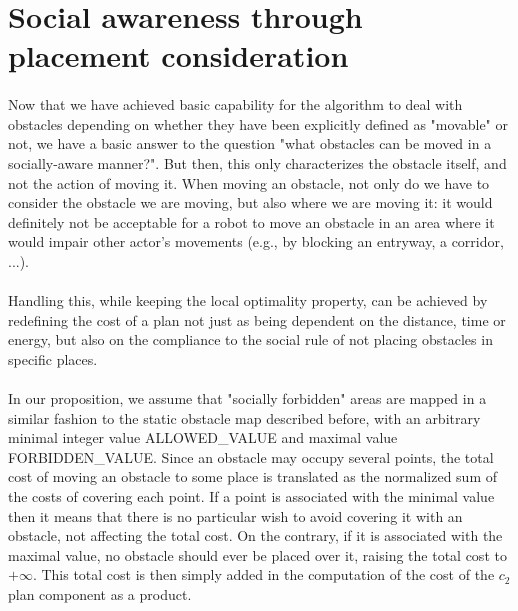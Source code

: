 \section{Social awareness through placement consideration}\label{social_appendix_placement_section}

\paragraph{} Now that we have achieved basic capability for the algorithm to deal with obstacles depending on whether they have been explicitly defined as "movable" or not, we have a basic answer to the question "what obstacles can be moved in a socially-aware manner?". But then, this only characterizes the obstacle itself, and not the action of moving it. When moving an obstacle, not only do we have to consider the obstacle we are moving, but also where we are moving it: it would definitely not be acceptable for a robot to move an obstacle in an area where it would impair other actor's movements (e.g., by blocking an entryway, a corridor, ...).

\paragraph{} Handling this, while keeping the local optimality property, can be achieved by redefining the cost of a plan not just as being dependent on the distance, time or energy, but also on the compliance to the social rule of not placing obstacles in specific places.

\paragraph{} In our proposition, we assume that "socially forbidden" areas are mapped in a similar fashion to the static obstacle map described before, with an arbitrary minimal integer value ALLOWED\_VALUE and maximal value FORBIDDEN\_VALUE. Since an obstacle may occupy several points, the total cost of moving an obstacle to some place is translated as the normalized sum of the costs of covering each point. If a point is associated with the minimal value then it means that there is no particular wish to avoid covering it with an obstacle, not affecting the total cost. On the contrary, if it is associated with the maximal value, no obstacle should ever be placed over it, raising the total cost to $+\infty$. This total cost is then simply added in the computation of the cost of the $c_{2}$ plan component as a product.

